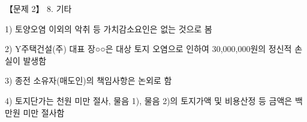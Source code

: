\begin{longquestion}{【문제 2】}
8. 기타 \par
1) 토양오염 이외의 악취 등 가치감소요인은 없는 것으로 봄 \par
2) Y주택건설(주) 대표 장○○은 대상 토지 오염으로 인하여 30,000,000원의 정신적 손실이 발생함 \par
3) 종전 소유자(매도인)의 책임사항은 논외로 함 \par
4) 토지단가는 천원 미만 절사, 물음 1), 물음 2)의 토지가액 및 비용산정 등 금액은 백만원 미만 절사함 \par
\end{longquestion}
